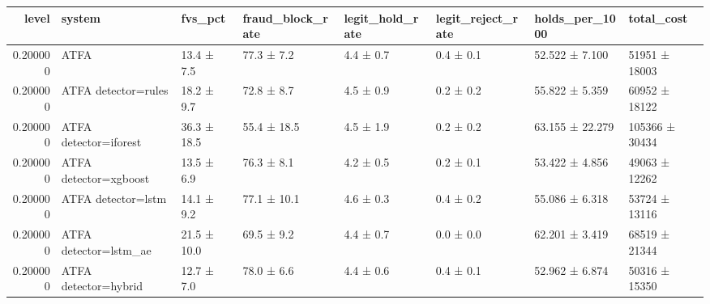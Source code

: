 \begin{tabular}{rlllllll}
\toprule
level & system & fvs\_pct & fraud\_block\_rate & legit\_hold\_rate & legit\_reject\_rate & holds\_per\_1000 & total\_cost \\
\midrule
0.200000 & ATFA & 13.4 ± 7.5 & 77.3 ± 7.2 & 4.4 ± 0.7 & 0.4 ± 0.1 & 52.522 ± 7.100 & 51951 ± 18003 \\
0.200000 & ATFA detector=rules & 18.2 ± 9.7 & 72.8 ± 8.7 & 4.5 ± 0.9 & 0.2 ± 0.2 & 55.822 ± 5.359 & 60952 ± 18122 \\
0.200000 & ATFA detector=iforest & 36.3 ± 18.5 & 55.4 ± 18.5 & 4.5 ± 1.9 & 0.2 ± 0.2 & 63.155 ± 22.279 & 105366 ± 30434 \\
0.200000 & ATFA detector=xgboost & 13.5 ± 6.9 & 76.3 ± 8.1 & 4.2 ± 0.5 & 0.2 ± 0.1 & 53.422 ± 4.856 & 49063 ± 12262 \\
0.200000 & ATFA detector=lstm & 14.1 ± 9.2 & 77.1 ± 10.1 & 4.6 ± 0.3 & 0.4 ± 0.2 & 55.086 ± 6.318 & 53724 ± 13116 \\
0.200000 & ATFA detector=lstm\_ae & 21.5 ± 10.0 & 69.5 ± 9.2 & 4.4 ± 0.7 & 0.0 ± 0.0 & 62.201 ± 3.419 & 68519 ± 21344 \\
0.200000 & ATFA detector=hybrid & 12.7 ± 7.0 & 78.0 ± 6.6 & 4.4 ± 0.6 & 0.4 ± 0.1 & 52.962 ± 6.874 & 50316 ± 15350 \\
\bottomrule
\end{tabular}

